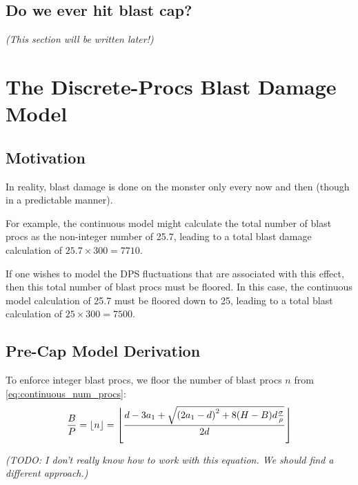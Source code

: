 \documentclass{article}
\begin{document}
\subsection{Do we ever hit blast cap?}%
\label{sub:do_we_ever_hit_blast_cap_}

\textit{(This section will be written later!)}


\newpage


\section{The Discrete-Procs Blast Damage Model}%
\label{sec:the_discrete_procs_blast_damage_model}


\subsection{Motivation}%
\label{sub:motivation}

In reality, blast damage is done on the monster only every now and then (though in a predictable manner).

For example, the continuous model might calculate the total number of blast procs as the non-integer number of 25.7, leading to a total blast damage calculation of $25.7 \times 300 = 7710$.

If one wishes to model the DPS fluctuations that are associated with this effect, then this total number of blast procs must be floored. In this case, the continuous model calculation of 25.7 must be floored down to 25, leading to a total blast calculation of $25 \times 300 = 7500$.


\subsection{Pre-Cap Model Derivation}%
\label{sub:dbm_pre_cap_model_derivation}

To enforce integer blast procs, we floor the number of blast procs $n$ from \eqref{eq:continuous_num_procs}:
\begin{equation}
    \frac{B}{P}
    = \floor*{n}
    = \floor*{\frac{d - 3 a_1 + \sqrt{\parens*{2 a_1 - d}^2 + 8 \parens*{H - B} d \frac{\sigma}{\rho}}}{2 d}}
\end{equation}

\textit{(TODO: I don't really know how to work with this equation. We should find a different approach.)}
\end{document}
